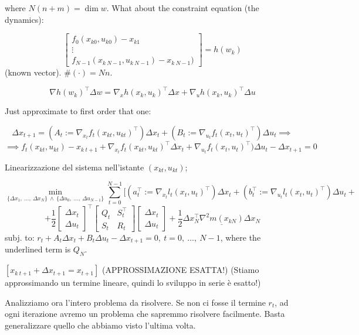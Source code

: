 where $N(n+m) = \dim{w}$. What about the constraint equation (the dynamics):

\[
	\begin{bmatrix}f_0(x_{k0},u_{k0}) - x_{k1}\\ \vdots\\ f_{N-1}(x_{k\ N-1}, u_{k\ N-1}) - x_{k\ N-1})\end{bmatrix} = h(w_k)
\]
(known vector). $\#(\mathord{\cdot}) = Nn$.

\[
	\nabla{h(w_k)}^\top\Delta w = \nabla_x{h(x_k,u_k)}^\top\Delta x + \nabla_u{h(x_k,u_k)}^\top\Delta u
\]

Just approximate to first order that one:

\[	
	\Delta x_{t+1} = (A_t := \nabla_{x_t}{f_t(x_{kt},u_{kt})}^\top)\Delta x_t + (B_t := \nabla_{u_t}{f_t(x_t,u_t)}^\top)\Delta u_t \implies
\]
\[
	\implies f_t(x_{kt},u_{kt}) - x_{k\ t+1} + \nabla_{x_t}{f_t(x_{kt},u_{kt})}^\top\Delta x_t + \nabla_{u_t}{f_t(x_t,u_t)}^\top)\Delta u_t -\Delta x_{t+1} = 0
\]

Linearizzazione del sistema nell'istante $(x_{kt},u_{kt})$;

\[
	\min_{\{\Delta x_1,\ \dots,\ \Delta x_N\}\ \land\ \{\Delta u_0,\ \dots,\ \Delta u_{N-1}\}}\sum_{t=0}^{N-1}[(a_t^\top := \nabla_{x_t}{l_t(x_t,u_t)}^\top)\Delta x_t + (b_t^\top := \nabla_{u_t}{l_t(x_t,u_t)}^\top)\Delta u_t +
\]
\[
	+ \frac{1}{2}\begin{bmatrix}\Delta x_t\\ \Delta u_t\end{bmatrix}^\top\begin{bmatrix}Q_t&S_t^\top\\S_t&R_t\end{bmatrix}\begin{bmatrix}\Delta x_t\\ \Delta u_t\end{bmatrix} + \frac{1}{2}\Delta x_N^\top \underline{\nabla^2{m(x_{kN})}}\Delta x_N
\]
subj. to: $r_t + A_t\Delta x_t + B_t\Delta u_t -\Delta x_{t+1} = 0,\ t=0,\ \dots,\ N-1$, where the underlined term is $Q_N$.

$[x_{k\ t+1} + \Delta x_{t+1} = x_{t+1}]$ (APPROSSIMAZIONE ESATTA!) (Stiamo approssimando un termine lineare, quindi lo sviluppo in serie è esatto!)

Analizziamo ora l'intero problema da risolvere. Se non ci fosse il termine $r_t$, ad ogni iterazione avremo un problema che sapremmo risolvere facilmente. Basta generalizzare quello che abbiamo visto l'ultima volta.

